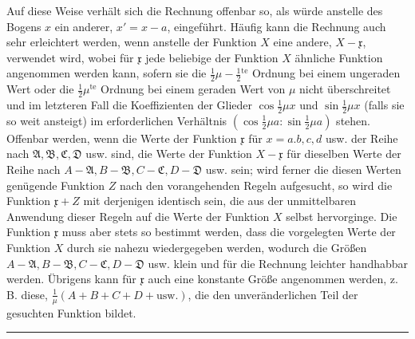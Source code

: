 Auf diese Weise verhält sich die Rechnung offenbar so, als würde anstelle des Bogens \(x\) ein anderer, \(x'=x-a\), eingeführt. Häufig kann die Rechnung auch sehr erleichtert werden, wenn anstelle der Funktion \(X\) eine andere, \(X-\mathfrak{x}\), verwendet wird, wobei für \(\mathfrak{x}\) jede beliebige der Funktion \(X\) ähnliche Funktion angenommen werden kann, sofern sie die \(\frac12\mu-\frac12{}^{\mathrm{te}}\) Ordnung bei einem ungeraden Wert oder die \(\frac12\mu^{\mathrm{te}}\) Ordnung bei einem geraden Wert von \(\mu\) nicht überschreitet und im letzteren Fall die Koeffizienten der Glieder \(\cos\frac12\mu x\) und \(\sin\frac12\mu x\) (falls sie so weit ansteigt) im erforderlichen Verhältnis \((\cos\frac12\mu a:\sin\frac12\mu a)\) stehen. Offenbar werden, wenn die Werte der Funktion \(\mathfrak{x}\) für \(x=a.b,c,d\) usw. der Reihe nach \(\mathfrak{A},\mathfrak{B},\mathfrak{C},\mathfrak{D}\) usw. sind, die Werte der Funktion \(X-\mathfrak{x}\) für dieselben Werte der Reihe nach \(A-\mathfrak{A},B-\mathfrak{B},C-\mathfrak{C},D-\mathfrak{D}\) usw. sein; wird ferner die diesen Werten genügende Funktion \(Z\) nach den vorangehenden Regeln aufgesucht, so wird die Funktion \(\mathfrak{x}+Z\) mit derjenigen identisch sein, die aus der unmittelbaren Anwendung dieser Regeln auf die Werte der Funktion \(X\) selbst hervorginge. Die Funktion \(\mathfrak{x}\) muss aber stets so bestimmt werden, dass die vorgelegten Werte der Funktion \(X\) durch sie nahezu wiedergegeben werden, wodurch die Größen \(A-\mathfrak{A},B-\mathfrak{B},C-\mathfrak{C},D-\mathfrak{D}\) usw. klein und für die Rechnung leichter handhabbar werden. Übrigens kann für \(\mathfrak{x}\) auch eine konstante Größe angenommen werden, z. B. diese, \(\frac1\mu(A+B+C+D+\text{usw.})\), die den unveränderlichen Teil der gesuchten Funktion bildet.

\begin{center}\rule{0.28\linewidth}{0.4pt}\end{center}
\endgroup
